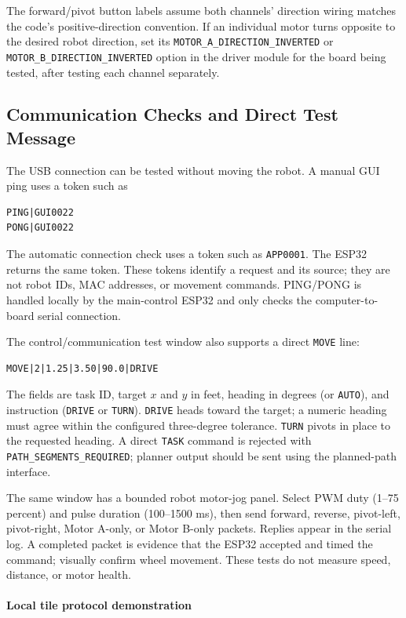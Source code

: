 \documentclass{article}
\begin{document}
The forward/pivot button labels assume both channels' direction wiring matches the code's positive-direction convention. If an individual motor turns opposite to the desired robot direction, set its \texttt{MOTOR\_A\_DIRECTION\_INVERTED} or \texttt{MOTOR\_B\_DIRECTION\_INVERTED} option in the driver module for the board being tested, after testing each channel separately.

\subsection{Communication Checks and Direct Test Message}

The USB connection can be tested without moving the robot. A manual GUI ping uses a token such as
\begin{lstlisting}
PING|GUI0022
PONG|GUI0022
\end{lstlisting}
The automatic connection check uses a token such as \texttt{APP0001}. The ESP32 returns the same token. These tokens identify a request and its source; they are not robot IDs, MAC addresses, or movement commands. PING/PONG is handled locally by the main-control ESP32 and only checks the computer-to-board serial connection.

The control/communication test window also supports a direct \texttt{MOVE} line:
\begin{lstlisting}
MOVE|2|1.25|3.50|90.0|DRIVE
\end{lstlisting}
The fields are task ID, target $x$ and $y$ in feet, heading in degrees (or \texttt{AUTO}), and instruction (\texttt{DRIVE} or \texttt{TURN}). \texttt{DRIVE} heads toward the target; a numeric heading must agree within the configured three-degree tolerance. \texttt{TURN} pivots in place to the requested heading. A direct \texttt{TASK} command is rejected with \texttt{PATH\_SEGMENTS\_REQUIRED}; planner output should be sent using the planned-path interface.

The same window has a bounded robot motor-jog panel. Select PWM duty (1--75 percent) and pulse duration (100--1500 ms), then send forward, reverse, pivot-left, pivot-right, Motor A-only, or Motor B-only packets. Replies appear in the serial log. A completed packet is evidence that the ESP32 accepted and timed the command; visually confirm wheel movement. These tests do not measure speed, distance, or motor health.

\paragraph{Local tile protocol demonstration}
\end{document}
